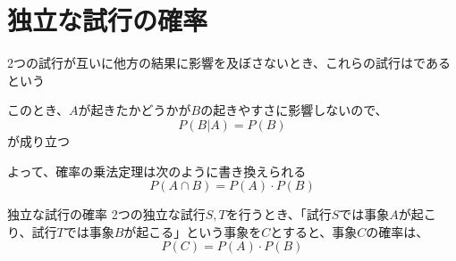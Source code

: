 \documentclass[../../../topic_probability-statistics]{subfiles}
\begin{document}
\sectionline
\section{独立な試行の確率}

2つの試行が互いに他方の結果に影響を及ぼさないとき、これらの試行はであるという

\br

このとき、$A$が起きたかどうかが$B$の起きやすさに影響しないので、
\begin{equation*}
  P(B|A) = P(B)
\end{equation*}
が成り立つ

よって、確率の乗法定理は次のように書き換えられる
\begin{equation*}
  P(A \cap B) = P(A) \cdot P(B)
\end{equation*}

\begin{theorem}{独立な試行の確率}
  2つの独立な試行$S,T$を行うとき、「試行$S$では事象$A$が起こり、試行$T$では事象$B$が起こる」という事象を$C$とすると、事象$C$の確率は、
  \begin{equation*}
    P(C) = P(A) \cdot P(B)
  \end{equation*}
\end{theorem}
\end{document}
